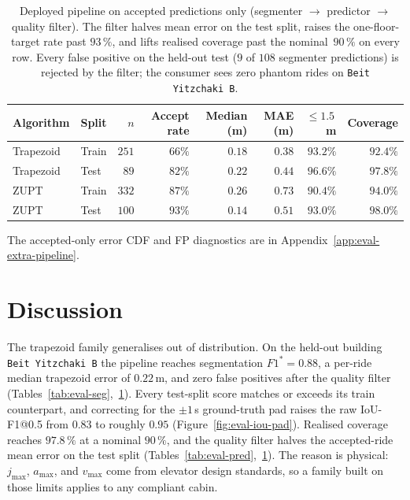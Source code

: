 \documentclass[manuscript,review,screen]{acmart}
\begin{document}
\begin{table}[H]
\centering
\small
\begin{tabular}{llrrrrrr}
\toprule
Algorithm & Split & $n$ & Accept rate & Median (m) & MAE (m) & $\le 1.5$\,m & Coverage \\
\midrule
Trapezoid & Train & $251$ & $66\%$ & $0.18$ & $0.38$ & $93.2\%$ & $92.4\%$ \\
Trapezoid & Test  & $\phantom{0}89$ & $82\%$ & $0.22$ & $0.44$ & $96.6\%$ & $97.8\%$ \\
ZUPT      & Train & $332$ & $87\%$ & $0.26$ & $0.73$ & $90.4\%$ & $94.0\%$ \\
ZUPT      & Test  & $100$ & $93\%$ & $0.14$ & $0.51$ & $93.0\%$ & $98.0\%$ \\
\bottomrule
\end{tabular}
\caption{Deployed pipeline on accepted predictions only
  (segmenter $\to$ predictor $\to$ quality filter).  The filter
  halves mean error on the test split, raises the one-floor-target
  rate past $93\,\%$, and lifts realised coverage past the
  nominal~$90\,\%$ on every row.  Every false positive on the
  held-out test ($9$ of $108$ segmenter predictions) is rejected
  by the filter; the consumer sees zero phantom rides on
  \texttt{Beit Yitzchaki~B}.}
\label{tab:eval-pipeline}
\end{table}

The accepted-only error CDF and FP diagnostics are in
Appendix~\ref{app:eval-extra-pipeline}.

\section{Discussion}
\label{sec:discussion}

The trapezoid family generalises out of distribution.  On the held-out
building \texttt{Beit Yitzchaki~B} the pipeline reaches segmentation
$F1^{\ast}\!=\!0.88$, a per-ride median trapezoid error of $0.22\,$m,
and zero false positives after the quality filter
(Tables~\ref{tab:eval-seg},~\ref{tab:eval-pipeline}).  Every test-split
score matches or exceeds its train counterpart, and correcting for the
$\pm 1\,$s ground-truth pad raises the raw IoU-F1@0.5 from $0.83$ to
roughly $0.95$ (Figure~\ref{fig:eval-iou-pad}).  Realised coverage
reaches $97.8\,\%$ at a nominal $90\,\%$, and the quality filter halves
the accepted-ride mean error on the test split
(Tables~\ref{tab:eval-pred},~\ref{tab:eval-pipeline}).  The reason is
physical: $j_{\max}$, $a_{\max}$, and $v_{\max}$ come from elevator
design standards, so a family built on those limits applies to any
compliant cabin.
\end{document}
